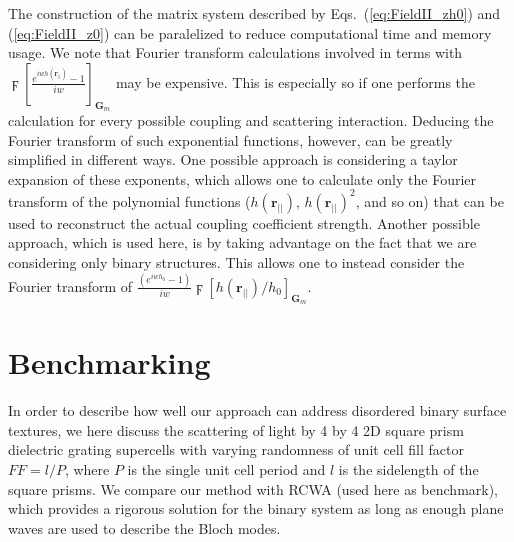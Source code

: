 \documentclass[ floatfix,reprint,amsmath,amssymb,aps,prb]{revtex4-1}
\begin{document}
The construction of the matrix system described by Eqs.~(\ref{eq:FieldII_zh0}) and (\ref{eq:FieldII_z0}) can be paralelized to reduce computational time and memory usage. We note that Fourier transform calculations involved in terms with  $ \digamma\left[  \frac{ e^{iw h( \mathbf{r_{||} } ) }-1}{iw}\right]_{\mathbf{G}_m} $ may be expensive. This is especially so if one performs the calculation for every possible coupling and scattering interaction. Deducing the Fourier transform of such exponential functions, however, can be greatly simplified in different ways. One possible approach is considering a taylor expansion of these exponents, which allows one to calculate only the Fourier transform of the polynomial functions ($ h( \mathbf{r_{||} } )$, $ h( \mathbf{r_{||} } )^2$, and so on) that can be used to reconstruct the actual coupling coefficient strength. Another possible approach, which is used here, is by taking advantage on the fact that we are considering only binary structures. This allows one to instead consider the Fourier transform of $ \frac{( e^{iw h_0 }-1)}{iw}\digamma\left[ h( \mathbf{r_{||} } )/h_0 \right]_{\mathbf{G}_m} $.   
   
\section{Benchmarking}

In order to describe how well our approach can address disordered binary surface textures, we here discuss the scattering of light by 4 by 4 2D square prism dielectric grating supercells with varying randomness of unit cell fill factor $FF=l/P$, where $P$ is the single unit cell period and $l$ is the sidelength of the square prisms. We compare our method with RCWA (used here as benchmark), which provides a rigorous solution for the binary system as long as enough plane waves are used to describe the Bloch modes.
 
\end{document}
